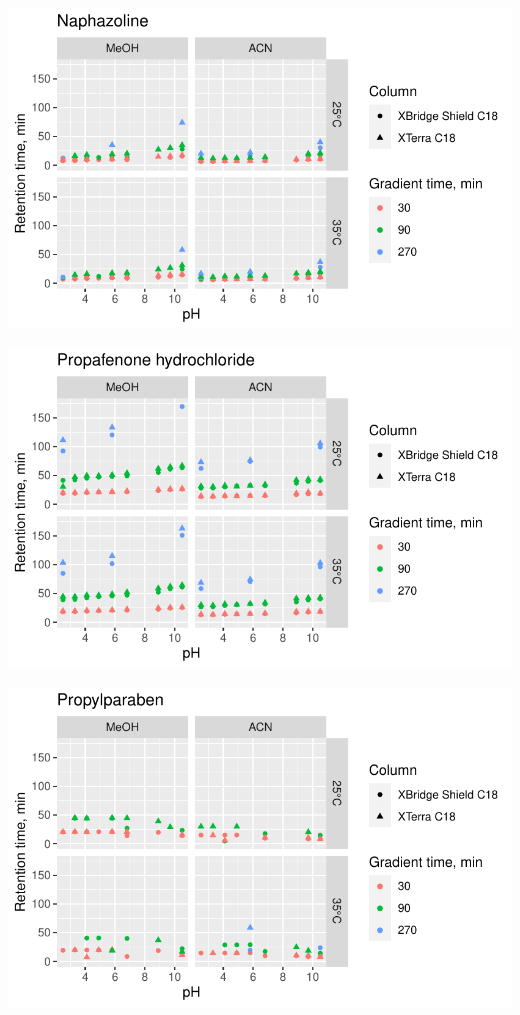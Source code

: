 \documentclass[
  letterpaper,
  DIV=11,
  numbers=noendperiod]{scrreprt}
\begin{document}
\includegraphics{index_files/figure-pdf/unnamed-chunk-4-15.pdf}

\includegraphics{index_files/figure-pdf/unnamed-chunk-4-16.pdf}

\includegraphics{index_files/figure-pdf/unnamed-chunk-4-17.pdf}
\end{document}
